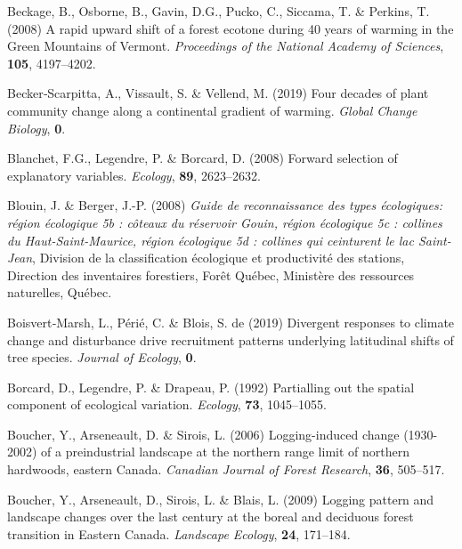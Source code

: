 \documentclass[a4paperpaper,]{article}
\begin{document}
\leavevmode\hypertarget{ref-beckage_rapid_2008}{}%
Beckage, B., Osborne, B., Gavin, D.G., Pucko, C., Siccama, T. \&
Perkins, T. (2008) A rapid upward shift of a forest ecotone during 40
years of warming in the Green Mountains of Vermont. \emph{Proceedings of
the National Academy of Sciences}, \textbf{105}, 4197--4202.

\leavevmode\hypertarget{ref-beckerscarpitta_four_2019}{}%
Becker‐Scarpitta, A., Vissault, S. \& Vellend, M. (2019) Four decades of
plant community change along a continental gradient of warming.
\emph{Global Change Biology}, \textbf{0}.

\leavevmode\hypertarget{ref-blanchet_forward_2008}{}%
Blanchet, F.G., Legendre, P. \& Borcard, D. (2008) Forward selection of
explanatory variables. \emph{Ecology}, \textbf{89}, 2623--2632.

\leavevmode\hypertarget{ref-blouin_guide_2008}{}%
Blouin, J. \& Berger, J.-P. (2008) \emph{Guide de reconnaissance des
types écologiques: région écologique 5b : côteaux du réservoir Gouin,
région écologique 5c : collines du Haut-Saint-Maurice, région écologique
5d : collines qui ceinturent le lac Saint-Jean}, Division de la
classification écologique et productivité des stations, Direction des
inventaires forestiers, Forêt Québec, Ministère des ressources
naturelles, Québec.

\leavevmode\hypertarget{ref-boisvertmarsh_divergent_2019}{}%
Boisvert‐Marsh, L., Périé, C. \& Blois, S. de (2019) Divergent responses
to climate change and disturbance drive recruitment patterns underlying
latitudinal shifts of tree species. \emph{Journal of Ecology},
\textbf{0}.

\leavevmode\hypertarget{ref-borcard_partialling_1992}{}%
Borcard, D., Legendre, P. \& Drapeau, P. (1992) Partialling out the
spatial component of ecological variation. \emph{Ecology}, \textbf{73},
1045--1055.

\leavevmode\hypertarget{ref-boucher_logging-induced_2006}{}%
Boucher, Y., Arseneault, D. \& Sirois, L. (2006) Logging-induced change
(1930-2002) of a preindustrial landscape at the northern range limit of
northern hardwoods, eastern Canada. \emph{Canadian Journal of Forest
Research}, \textbf{36}, 505--517.

\leavevmode\hypertarget{ref-boucher_logging_2009}{}%
Boucher, Y., Arseneault, D., Sirois, L. \& Blais, L. (2009) Logging
pattern and landscape changes over the last century at the boreal and
deciduous forest transition in Eastern Canada. \emph{Landscape Ecology},
\textbf{24}, 171--184.
\end{document}
